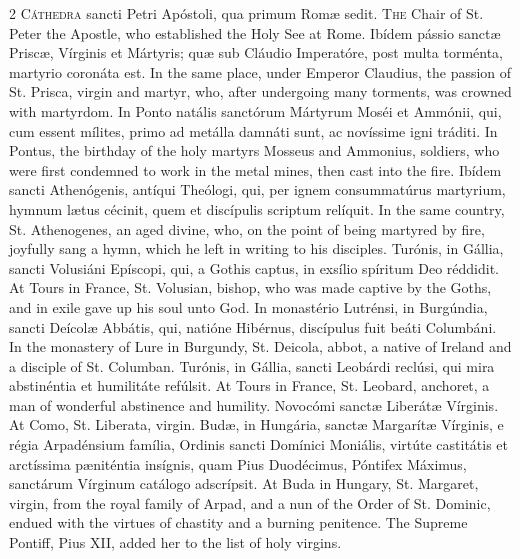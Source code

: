 \begin{paracol}{2}
\lettrine[lines=2]{C}{áthedra} sancti Petri Apóstoli, qua primum Romæ 
 sedit.
\switchcolumn
{}
\lettrine[lines=2]{T}{he} Chair of St. Peter the Apostle, who established the Holy See at Rome.
\switchcolumn*
{}
Ibídem pássio sanctæ Priscæ, Vírginis et 
 Mártyris; quæ sub Cláudio Imperatóre, post multa torménta, martyrio coronáta 
 est.
\switchcolumn
{}
In the same place, under Emperor Claudius, the passion of St. Prisca, virgin 
 and martyr, who, after undergoing many torments, was crowned with martyrdom.
\switchcolumn*
{}
In Ponto natális sanctórum Mártyrum Moséi et 
 Ammónii, qui, cum essent mílites, primo ad metálla damnáti sunt, ac 
 novíssime igni tráditi.
\switchcolumn
{}
In Pontus, the birthday of the holy martyrs Mosseus and Ammonius, soldiers, 
 who were first condemned to work in the metal mines, then cast into the 
 fire.
\switchcolumn*
{}
Ibídem sancti Athenógenis, antíqui Theólogi, 
 qui, per ignem consummatúrus martyrium, hymnum lætus cécinit, quem et 
 discípulis scriptum relíquit.
\switchcolumn
{}
In the same country, St. Athenogenes, an aged divine, who, on the point of 
 being martyred by fire, joyfully sang a hymn, which he left in writing to 
 his disciples.
\switchcolumn*
{}
Turónis, in Gállia, sancti Volusiáni Epíscopi, qui, a Gothis captus, in 
 exsílio spíritum Deo réddidit.
\switchcolumn
{}
At Tours in France, St. Volusian, bishop, who was made captive by the Goths, 
 and in exile gave up his soul unto God.
\switchcolumn*
{}
In monastério Lutrénsi, in Burgúndia, sancti Deícolæ 
 Abbátis, qui, natióne Hibérnus, discípulus fuit beáti Columbáni.
\switchcolumn
{}
In the monastery of Lure in Burgundy, St. Deicola, abbot, a native of 
 Ireland and a disciple of St. Columban.
\switchcolumn*
{}
Turónis, in Gállia, sancti Leobárdi reclúsi, qui mira abstinéntia et 
 humilitáte refúlsit.
\switchcolumn
{}
At Tours in France, St. Leobard, anchoret, a man of wonderful abstinence and 
 humility.
\switchcolumn*
{}
Novocómi sanctæ Liberátæ Vírginis.
\switchcolumn
{}
At Como, St. Liberata, virgin.
\switchcolumn*
{}
Budæ, in Hungária, sanctæ Margarítæ Vírginis, e 
 régia Arpadénsium família, Ordinis sancti Domínici Moniális, virtúte 
 castitátis et arctíssima pæniténtia insígnis, quam Pius Duodécimus, Póntifex 
 Máximus, sanctárum Vírginum catálogo adscrípsit.
\switchcolumn
{}
At Buda in Hungary, St. Margaret, virgin, from the royal family of Arpad, 
 and a nun of the Order of St. Dominic, endued with the virtues of chastity 
 and a burning penitence. The Supreme Pontiff, Pius XII, added her to 
 the list of holy virgins.
\switchcolumn*
{}
\end{paracol}


